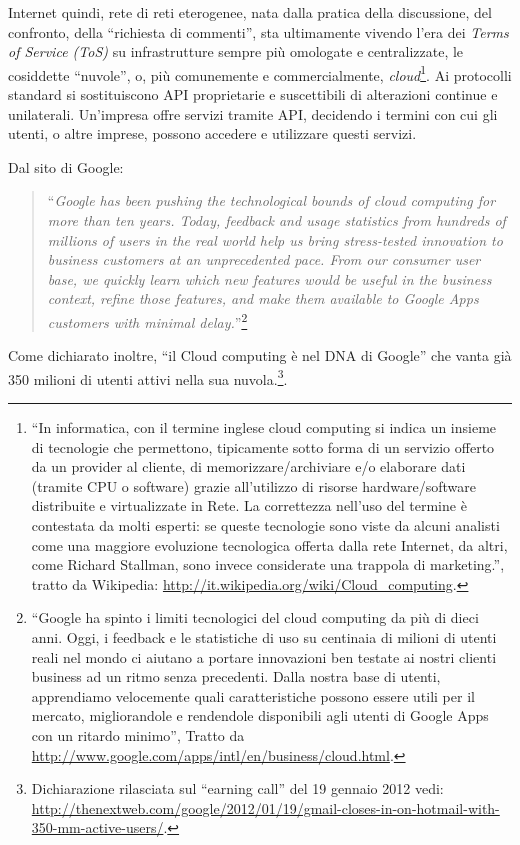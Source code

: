 Internet quindi, rete di reti eterogenee, nata dalla pratica della
discussione, del confronto, della ``richiesta di commenti'', sta
ultimamente vivendo l'era dei \emph{Terms of Service (ToS)} su
infrastrutture sempre più omologate e centralizzate, le cosiddette
``nuvole'', o, più comunemente e commercialmente,
\emph{cloud}\footnote{``In informatica, con il termine inglese cloud
  computing si indica un insieme di tecnologie che permettono,
  tipicamente sotto forma di un servizio offerto da un provider al
  cliente, di memorizzare/archiviare e/o elaborare dati (tramite CPU o
  software) grazie all'utilizzo di risorse hardware/software
  distribuite e virtualizzate in Rete.  La correttezza nell'uso del
  termine è contestata da molti esperti: se queste tecnologie sono
  viste da alcuni analisti come una maggiore evoluzione tecnologica
  offerta dalla rete Internet, da altri, come Richard Stallman, sono
  invece considerate una trappola di marketing.'', tratto da
  Wikipedia: \url{http://it.wikipedia.org/wiki/Cloud_computing}.}. Ai
protocolli standard si sostituiscono API proprietarie e suscettibili
di alterazioni continue e unilaterali. Un'impresa offre servizi
tramite API, decidendo i termini con cui gli utenti, o altre imprese,
possono accedere e utilizzare questi servizi.

Dal sito di Google:
\begin{quote}
  ``\emph{Google has been pushing the technological bounds of cloud
  computing for more than ten years. Today, feedback and usage
  statistics from hundreds of millions of users in the real world help
  us bring stress-tested innovation to business customers at an
  unprecedented pace. From our consumer user base, we quickly learn
  which new features would be useful in the business context, refine
  those features, and make them available to Google Apps customers
  with minimal delay.}''\footnote{``Google ha spinto i limiti
    tecnologici del cloud computing da più di dieci anni. Oggi, i
    feedback e le statistiche di uso su centinaia di milioni di utenti
    reali nel mondo ci aiutano a portare innovazioni ben testate ai
    nostri clienti business ad un ritmo senza precedenti. Dalla nostra
    base di utenti, apprendiamo velocemente quali caratteristiche
    possono essere utili per il mercato, migliorandole e rendendole
    disponibili agli utenti di Google Apps con un ritardo minimo'',
    Tratto da
    \url{http://www.google.com/apps/intl/en/business/cloud.html}.}
\end{quote}

Come dichiarato inoltre, ``il Cloud computing è nel DNA di Google''
che vanta già 350 milioni di utenti attivi nella sua
nuvola.\footnote{Dichiarazione rilasciata sul ``earning call'' del 19
  gennaio 2012 vedi:
  \url{http://thenextweb.com/google/2012/01/19/gmail-closes-in-on-hotmail-with-350-mm-active-users/}.}.

